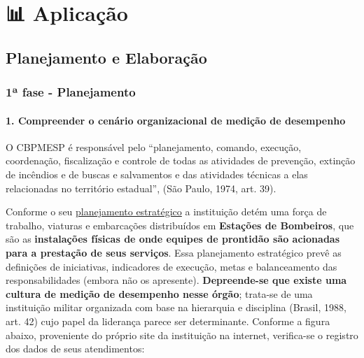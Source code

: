 \documentclass[
  letterpaper,
  DIV=11,
  numbers=noendperiod]{scrreprt}
\begin{document}
\part{📊 Aplicação}

\hypertarget{planejamento-e-elaborauxe7uxe3o}{%
\chapter{Planejamento e
Elaboração}\label{planejamento-e-elaborauxe7uxe3o}}

\hypertarget{uxaa-fase---planejamento-1}{%
\section{1ª fase - Planejamento}\label{uxaa-fase---planejamento-1}}

\hypertarget{compreender-o-cenuxe1rio-organizacional-de-mediuxe7uxe3o-de-desempenho-1}{%
\subsection{1. Compreender o cenário organizacional de medição de
desempenho}\label{compreender-o-cenuxe1rio-organizacional-de-mediuxe7uxe3o-de-desempenho-1}}

O CBPMESP é responsável pelo ``planejamento, comando, execução,
coordenação, fiscalização e controle de todas as atividades de
prevenção, extinção de incêndios e de buscas e salvamentos e das
atividades técnicas a elas relacionadas no território estadual'', (São
Paulo, 1974, art. 39).

Conforme o seu
\href{http://www.ccb.policiamilitar.sp.gov.br/portalcb/_institucional/midias/Planejamento-Estrate\%CC\%81gico-14DEZ20.pdf}{planejamento
estratégico} a instituição detém uma força de trabalho, viaturas e
embarcações distribuídos em \textbf{Estações de Bombeiros}, que são as
\textbf{instalações físicas de onde equipes de prontidão são acionadas
para a prestação de seus serviços}. Essa planejamento estratégico prevê
as definições de iniciativas, indicadores de execução, metas e
balanceamento das responsabilidades (embora não os apresente).
\textbf{Depreende-se que existe uma cultura de medição de desempenho
nesse órgão}; trata-se de uma instituição militar organizada com base na
hierarquia e disciplina (Brasil, 1988, art. 42) cujo papel da liderança
parece ser determinante. Conforme a figura abaixo, proveniente do
próprio site da instituição na internet, verifica-se o registro dos
dados de seus atendimentos:
\end{document}
